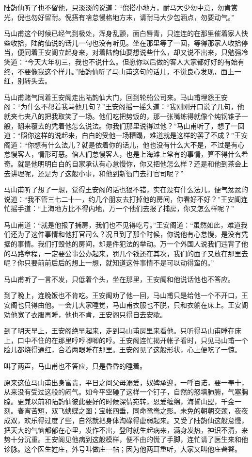 \documentclass[12pt,UTF8]{ctexbook}
\begin{document}
{{{陆韵仙听了也不留他，只淡淡的说道：“倪搭小地方，耐马大少勿中意，勿肯赏光，倪也勿好留耐。倪搭有啥怠慢格地方末，请耐马大少包涵点，勿要动气。”

马山甫这个时候已经气到极处，浑身乱颤，面白唇青，只连连的在那里催着家人快些收拾，陆韵仙说的话儿一句也没有听见。坐在那里等了一回，等得那家人收拾停当，便同着王安阁立起身来，对着陆韵仙要想说些什么，却又说不出来，只勉强冷笑道：“今天大年初三，我也不说什么。但愿你以后做的客人大家都好好的有始有终，不要像我这个样儿。”陆韵仙听了马山甫这句的话儿，不觉良心发现，面上一红，别转头去。

马山甫赌气同着王安阁走出陆韵仙大门，回到轮船公司来。马山甫埋怨王安阁：“为什么不帮着我骂他几句？”王安阁摇一摇头道：“我刚刚开口说了几句，他就夹七夹八的把我取笑了一场。他们吃把势饭的，那一张嘴练得就像个纯钢锥子一般，翻来覆去的凭着他怎么说法。你我们那里说得过他？”马山甫听了，想了一回道：“照你这样的说起来，白白的受他一场糟蹋，难道就是这样的罢了不成？”王安阁道：“你想有什么法儿？就是依着你的话儿，他也没有什么大不是，不过是有心怠慢客人，情形可恶。倌人们怠慢客人，也是上海滩上常有的事情，算不得什么希奇。就是他明明白白的自家承认有心怠慢你，你又把他怎么样？还是和他到茶会上去讲理呢，还是为了这般小事，和他到新衙门去打官司呢？”

马山甫听了想了一想，觉得王安阁的话也狠不错，实在没有什么法儿，便气忿忿的说道：“我不管三七二十一，约几个朋友去打掉他的房间，你看好不好？”王安阁连忙摇手道：“上海地方比不得内地，万一个他们去报了捕房，你又怎么样呢？”

马山甫道：“就是他报了捕房，我们也不见得吃亏。”王安阁道：“虽然如此，难道我们还为了这件事情和他打官司么？况且到了那个时候，你说他有心怠慢，是没有凭据的事情。我们打毁他的房间，却是件犯法的举动。万一个外国人说我们违背了他的马路章程，一定要公事公办起来，罚几个钱还在其次，我们的面子又放在那里去呢？你只要前前后后的想上一想，就知道这件事情不是可以动得蛮的。”

马山甫听了一言不发，只低着个头，坐在那里，王安阁和他说话他也不答应。

到了晚上，连晚饭也不肯吃。王安阁劝了他一回，马山甫只是给他一个不开口，王安阁也只得由他。一会儿大家睡觉，马山甫衣服也不脱，只和衣躺在床上。王安阁劝他宽了衣服再睡，他也不肯，王安阁只得自去安歇。

到了明天早上，王安阁绝早起来，走到马山甫房里来看他。只听得马山甫睡在床上，口中不住的在那里哼哼唧唧的哼。王安阁连忙揭开帐子看时，只见马山甫一个脸儿都烧得通红，合着两眼睡在那里。王安阁见了这般形状，心上便吃了一惊。

叫了两声，马山甫也不答应，只是昏昏的睡着。

原来这位马山甫出身富贵，平日之间父母溺爱，奴婢承迎，一呼百诺，要一奉十，从来没有受过这般的闷气。如今平空碰了这样一个钉子，自然的怒填肺腑，气塞胸膛。更兼以前和陆韵仙彼此要好的时候深情宛转，恩爱缠绵，海誓山盟，千金一刻。春宵苦短，双飞蛱蝶之图；宝帐四垂，同命鸳鸯之影。未免的朝朝交颈，夜夜成双，欢乐得过度了些，自然就把身体淘碌得虚弱起来。又受了陆韵仙这般怠慢，把天大的气恼都郁在心里，发作不出，登时就生起病来，满身发热，神识不清，来势十分沉重。王安阁见他病到这般模样，便不由的慌了手脚，连忙请了医生来和他诊脉。这个医生姓庄，外号叫做庄一帖；因为他两耳重听，大家又叫他庄聋聱。

}}}
\end{document}
